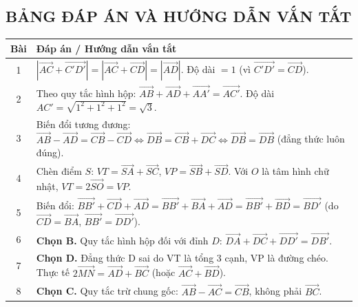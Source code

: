 \documentclass[12pt,a4paper]{article}
\begin{document}
\subsection*{BẢNG ĐÁP ÁN VÀ HƯỚNG DẪN VẮN TẮT}
\begin{center}
\begin{tabularx}{\textwidth}{|c|X|}
\hline
\textbf{Bài} & \textbf{Đáp án / Hướng dẫn vắn tắt} \\
\hline
1 & $|\overrightarrow{AC} + \overrightarrow{C'D'}| = |\overrightarrow{AC} + \overrightarrow{CD}| = |\overrightarrow{AD}|$. Độ dài $= 1$ (vì $\overrightarrow{C'D'} = \overrightarrow{CD}$). \\
\hline
2 & Theo quy tắc hình hộp: $\overrightarrow{AB} + \overrightarrow{AD} + \overrightarrow{AA'} = \overrightarrow{AC'}$. Độ dài $AC' = \sqrt{1^2 + 1^2 + 1^2} = \sqrt{3}$. \\
\hline
3 & Biến đổi tương đương: $\overrightarrow{AB} - \overrightarrow{AD} = \overrightarrow{CB} - \overrightarrow{CD} \Leftrightarrow \overrightarrow{DB} = \overrightarrow{CB} + \overrightarrow{DC} \Leftrightarrow \overrightarrow{DB} = \overrightarrow{DB}$ (đẳng thức luôn đúng). \\
\hline
4 & Chèn điểm $S$: $VT = \overrightarrow{SA} + \overrightarrow{SC}$, $VP = \overrightarrow{SB} + \overrightarrow{SD}$. Với $O$ là tâm hình chữ nhật, $VT = 2\overrightarrow{SO} = VP$. \\
\hline
5 & Biến đổi: $\overrightarrow{BB'} + \overrightarrow{CD} + \overrightarrow{AD} = \overrightarrow{BB'} + \overrightarrow{BA} + \overrightarrow{AD} = \overrightarrow{BB'} + \overrightarrow{BD} = \overrightarrow{BD'}$ (do $\overrightarrow{CD}=\overrightarrow{BA}$, $\overrightarrow{BB'}=\overrightarrow{DD'}$). \\
\hline
6 & \textbf{Chọn B.} Quy tắc hình hộp đối với đỉnh $D$: $\overrightarrow{DA} + \overrightarrow{DC} + \overrightarrow{DD'} = \overrightarrow{DB'}$. \\
\hline
7 & \textbf{Chọn D.} Đẳng thức D sai do VT là tổng 3 cạnh, VP là đường chéo. Thực tế $2\overrightarrow{MN} = \overrightarrow{AD} + \overrightarrow{BC}$ (hoặc $\overrightarrow{AC}+\overrightarrow{BD}$). \\
\hline
8 & \textbf{Chọn C.} Quy tắc trừ chung gốc: $\overrightarrow{AB} - \overrightarrow{AC} = \overrightarrow{CB}$, không phải $\overrightarrow{BC}$. \\
\hline
\end{tabularx}
\end{center}
\end{document}
